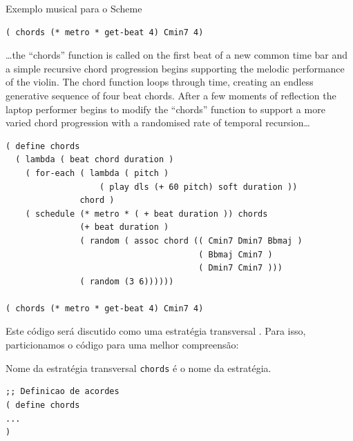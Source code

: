 \begin{example}{Exemplo musical para o Scheme}
\begin{verbatim}
( chords (* metro * get-beat 4) Cmin7 4)
\end{verbatim}

\begin{citacao}
{\ldots the “chords” function is called on the first beat of a new common time bar and a simple recursive chord progression begins supporting the melodic performance of the violin. The chord function loops through time, creating an endless generative sequence of four beat chords. After a few moments of reflection the laptop performer begins to modify the “chords” function to support a more varied chord progression with a randomised rate of temporal recursion\ldots}
\end{citacao}

\begin{verbatim}
( define chords
  ( lambda ( beat chord duration )
    ( for-each ( lambda ( pitch )
                   ( play dls (+ 60 pitch) soft duration ))
               chord )
    ( schedule (* metro * ( + beat duration )) chords
               (+ beat duration )
               ( random ( assoc chord (( Cmin7 Dmin7 Bbmaj )
                                       ( Bbmaj Cmin7 )
                                       ( Dmin7 Cmin7 )))
               ( random (3 6))))))
               
( chords (* metro * get-beat 4) Cmin7 4)
\end{verbatim}
\end{example}

Este código será discutido como uma estratégia transversal . Para isso, particionamos o código para uma melhor compreensão:

\begin{example}{Nome da estratégia transversal}
\verb|chords| é o nome da estratégia.

\begin{verbatim}
;; Definicao de acordes
( define chords
...
)
\end{verbatim}
\end{example}

